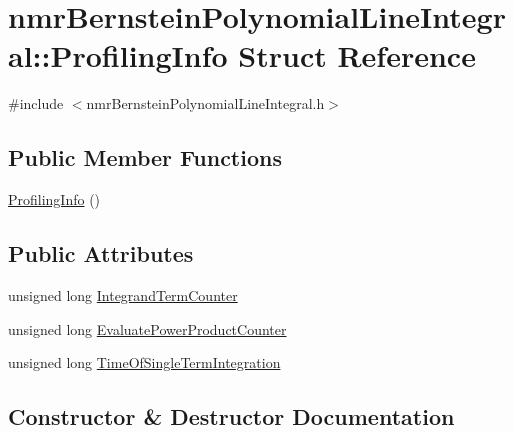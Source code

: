 \hypertarget{structnmr_bernstein_polynomial_line_integral_1_1_profiling_info}{}\section{nmr\+Bernstein\+Polynomial\+Line\+Integral\+:\+:Profiling\+Info Struct Reference}
\label{structnmr_bernstein_polynomial_line_integral_1_1_profiling_info}


{\ttfamily \#include $<$nmr\+Bernstein\+Polynomial\+Line\+Integral.\+h$>$}

\subsection*{Public Member Functions}
\begin{DoxyCompactItemize}
\item 
\hyperlink{structnmr_bernstein_polynomial_line_integral_1_1_profiling_info_ab4fd7355e43e55ab12c3f5d53a113364}{Profiling\+Info} ()
\end{DoxyCompactItemize}
\subsection*{Public Attributes}
\begin{DoxyCompactItemize}
\item 
unsigned long \hyperlink{structnmr_bernstein_polynomial_line_integral_1_1_profiling_info_a394ec4b165591d1d81baffe5a7de562f}{Integrand\+Term\+Counter}
\item 
unsigned long \hyperlink{structnmr_bernstein_polynomial_line_integral_1_1_profiling_info_ae3c1d0a4469dfffa0fd47b2c71582dd9}{Evaluate\+Power\+Product\+Counter}
\item 
unsigned long \hyperlink{structnmr_bernstein_polynomial_line_integral_1_1_profiling_info_a6aabda6c9c68e2e233a7445c1ef49557}{Time\+Of\+Single\+Term\+Integration}
\end{DoxyCompactItemize}


\subsection{Constructor \& Destructor Documentation}
\hypertarget{structnmr_bernstein_polynomial_line_integral_1_1_profiling_info_ab4fd7355e43e55ab12c3f5d53a113364}{}
